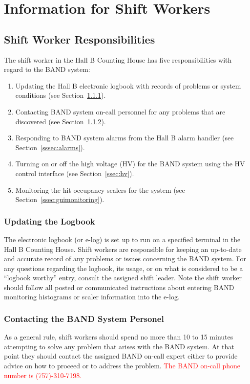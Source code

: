 \documentclass[12pt,letterpaper]{article}
\begin{document}
\section{Information for Shift Workers}

\subsection{Shift Worker Responsibilities}
The shift worker in the Hall B Counting House has five responsibilities with regard to the BAND system:
\begin{enumerate}
\item Updating the Hall B electronic logbook with records of problems or system conditions (see Section~\ref{sssec:logbook}).
\item Contacting BAND system on-call personnel for any problems that are discovered (see Section~\ref{sssec:personel}).
\item Responding to BAND system alarms from the Hall B alarm handler (see Section~\ref{sssec:alarms}).
\item Turning on or off the high voltage (HV) for the BAND system using the HV control interface (see Section~\ref{ssec:hv}).
\item Monitoring the hit occupancy scalers for the system (see Section~\ref{ssec:guimonitoring}).
\end{enumerate}

\subsubsection{Updating the Logbook}
\label{sssec:logbook}
The electronic logbook (or e-log) is set up to run on a specified terminal in the Hall B Counting House. Shift workers are responsible for keeping an up-to-date and accurate record of any problems or issues concerning the BAND system. For any questions regarding the logbook, its usage, or on what is considered to be a “logbook worthy” entry, consult the assigned shift leader.
Note the shift worker should follow all posted or communicated instructions about entering BAND monitoring histograms or scaler information into the e-log. 
\subsubsection{Contacting the BAND System Personel}
\label{sssec:personel}
As a general rule, shift workers should spend no more than 10 to 15 minutes attempting to solve any problem that arises with the BAND system. At that point they should contact the assigned BAND on-call expert either to provide advice on how to proceed or to address the problem. \textcolor{red}{The BAND on-call phone number is (757)-310-7198.}
\end{document}

